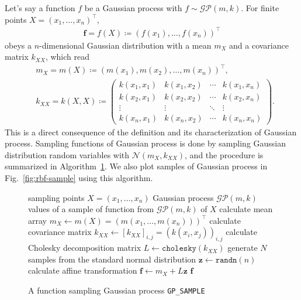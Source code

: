 Let's say a function $f$ be a Gaussian process with $f\sim\mathcal{GP}(m,k)$.
For finite points $X=(x_{1},\dots,x_{n})^{\top}$,
\begin{align}
    \bm{f}=f(X)\coloneqq(f(x_{1}),\dots,f(x_{n}))^{\top}
\end{align}
obeys a $n$-dimensional Gaussian distribution with a mean $m_{X}$ and a covariance matrix $k_{XX}$, which read
\begin{align}
    &m_{X}=m(X)\coloneqq(m(x_1),m(x_2),\dots,m(x_n))^{\top},\\
    &k_{XX}=k(X,X)\coloneqq\begin{pmatrix}
        k(x_{1},x_{1}) & k(x_{1},x_{2}) & \cdots & k(x_{1},x_{n})\\
        k(x_{2},x_{1}) & k(x_{2},x_{2}) & \cdots & k(x_{2},x_{n})\\
        \vdots & \vdots & \ddots & \vdots \\
        k(x_{n},x_{1}) & k(x_{n},x_{2}) & \cdots & k(x_{n},x_{n})
    \end{pmatrix}.
\end{align}
This is a direct consequence of the definition and its characterization of Gaussian process.
Sampling functions of Gaussian process is done by sampling Gaussian distribution random variables with $\mathcal{N}(m_{X},k_{XX})$, and the procedure is summarized in Algorithm~\ref{alg:gp_sample}.
We also plot samples of Gaussian process in Fig.~\ref{fig:rbf-sample} using this algorithm.

\begin{figure}[htbp]
    \begin{algorithm}[H]
      \caption{A function sampling Gaussian process \texttt{GP\_SAMPLE}}
      \label{alg:gp_sample}
      \begin{algorithmic}
      \Input sampling points $X=(x_{1},\dots,x_{n})$
      \Input Gaussian process $\mathcal{GP}(m,k)$ 
      \Output values of a sample of function from $\mathcal{GP}(m,k)$ of $X$
      \State calculate mean array $m_{X} \gets m(X)=(m(x_{1},\dots,m(x_{n})))^{\top}$
      \State calculate covariance matrix $k_{XX} \gets [k_{XX}]_{i,j}=(k(x_{i},x_{j}))_{i,j}$
      \State calculate Cholesky decomposition matrix $L\gets\texttt{cholesky}(k_{XX})$ %
      \State generate $N$ samples from the standard normal distribution $\bm{z}\gets\texttt{randn}(n)$
      \State calculate affine transformation $\bm{f}\gets m_{X}+L\bm{z}$ 
      \State \Return $\bm{f}$
      \EndFunction
      \end{algorithmic}
    \end{algorithm}
\end{figure}

